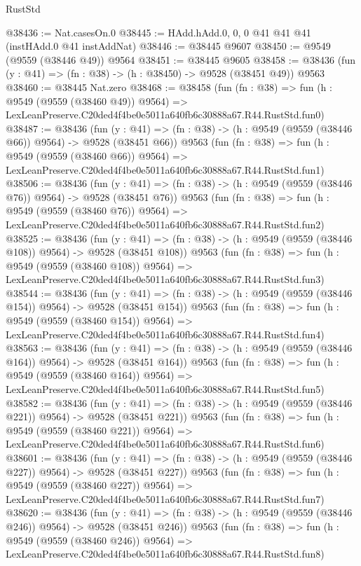\begin{lexlean}{RustStd}
\begin{coremodule}
@38436 := Nat.casesOn.{0}
@38445 := HAdd.hAdd.{0, 0, 0} @41 @41 @41 (instHAdd.{0} @41 instAddNat)
@38446 := @38445 @9607
@38450 := @9549 (@9559 (@38446 @49)) @9564
@38451 := @38445 @9605
@38458 := @38436 (fun (y : @41) => (fn : @38) -> (h : @38450) -> @9528 (@38451 @49)) @9563
@38460 := @38445 Nat.zero
@38468 := @38458
    (fun (fn : @38) =>
    fun (h : @9549 (@9559 (@38460 @49)) @9564) =>
    LexLeanPreserve.C20ded4f4be0e5011a640fb6c30888a67.R44.RustStd.fun0)
@38487 := @38436
    (fun (y : @41) => (fn : @38) -> (h : @9549 (@9559 (@38446 @66)) @9564) -> @9528 (@38451 @66))
    @9563
    (fun (fn : @38) =>
    fun (h : @9549 (@9559 (@38460 @66)) @9564) =>
    LexLeanPreserve.C20ded4f4be0e5011a640fb6c30888a67.R44.RustStd.fun1)
@38506 := @38436
    (fun (y : @41) => (fn : @38) -> (h : @9549 (@9559 (@38446 @76)) @9564) -> @9528 (@38451 @76))
    @9563
    (fun (fn : @38) =>
    fun (h : @9549 (@9559 (@38460 @76)) @9564) =>
    LexLeanPreserve.C20ded4f4be0e5011a640fb6c30888a67.R44.RustStd.fun2)
@38525 := @38436
    (fun (y : @41) => (fn : @38) -> (h : @9549 (@9559 (@38446 @108)) @9564) -> @9528 (@38451 @108))
    @9563
    (fun (fn : @38) =>
    fun (h : @9549 (@9559 (@38460 @108)) @9564) =>
    LexLeanPreserve.C20ded4f4be0e5011a640fb6c30888a67.R44.RustStd.fun3)
@38544 := @38436
    (fun (y : @41) => (fn : @38) -> (h : @9549 (@9559 (@38446 @154)) @9564) -> @9528 (@38451 @154))
    @9563
    (fun (fn : @38) =>
    fun (h : @9549 (@9559 (@38460 @154)) @9564) =>
    LexLeanPreserve.C20ded4f4be0e5011a640fb6c30888a67.R44.RustStd.fun4)
@38563 := @38436
    (fun (y : @41) => (fn : @38) -> (h : @9549 (@9559 (@38446 @164)) @9564) -> @9528 (@38451 @164))
    @9563
    (fun (fn : @38) =>
    fun (h : @9549 (@9559 (@38460 @164)) @9564) =>
    LexLeanPreserve.C20ded4f4be0e5011a640fb6c30888a67.R44.RustStd.fun5)
@38582 := @38436
    (fun (y : @41) => (fn : @38) -> (h : @9549 (@9559 (@38446 @221)) @9564) -> @9528 (@38451 @221))
    @9563
    (fun (fn : @38) =>
    fun (h : @9549 (@9559 (@38460 @221)) @9564) =>
    LexLeanPreserve.C20ded4f4be0e5011a640fb6c30888a67.R44.RustStd.fun6)
@38601 := @38436
    (fun (y : @41) => (fn : @38) -> (h : @9549 (@9559 (@38446 @227)) @9564) -> @9528 (@38451 @227))
    @9563
    (fun (fn : @38) =>
    fun (h : @9549 (@9559 (@38460 @227)) @9564) =>
    LexLeanPreserve.C20ded4f4be0e5011a640fb6c30888a67.R44.RustStd.fun7)
@38620 := @38436
    (fun (y : @41) => (fn : @38) -> (h : @9549 (@9559 (@38446 @246)) @9564) -> @9528 (@38451 @246))
    @9563
    (fun (fn : @38) =>
    fun (h : @9549 (@9559 (@38460 @246)) @9564) =>
    LexLeanPreserve.C20ded4f4be0e5011a640fb6c30888a67.R44.RustStd.fun8)

\end{coremodule}
\end{lexlean}
